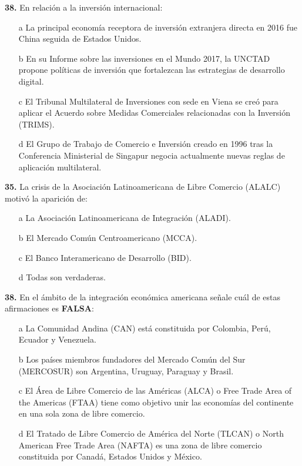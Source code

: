 \documentclass{nuevotema}
\begin{document}
\preguntas


\textbf{38.} En relación a la inversión internacional:

\begin{itemize}
	\item[a] La principal economía receptora de inversión extranjera directa en 2016 fue China seguida de Estados Unidos.
	\item[b] En su Informe sobre las inversiones en el Mundo 2017, la UNCTAD propone políticas de inversión que fortalezcan las estrategias de desarrollo digital.
	\item[c] El Tribunal Multilateral de Inversiones con sede en Viena se creó para aplicar el Acuerdo sobre Medidas Comerciales relacionadas con la Inversión (TRIMS).
	\item[d] El Grupo de Trabajo de Comercio e Inversión creado en 1996 tras la Conferencia Ministerial de Singapur negocia actualmente nuevas reglas de aplicación multilateral.
\end{itemize}

\textbf{35.} La crisis de la Asociación Latinoamericana de Libre Comercio (ALALC) motivó la aparición de:
\begin{itemize}
	\item[a] La Asociación Latinoamericana de Integración (ALADI).
	\item[b] El Mercado Común Centroamericano (MCCA).
	\item[c] El Banco Interamericano de Desarrollo (BID).
	\item[d] Todas son verdaderas.
\end{itemize}

\textbf{38.} En el ámbito de la integración económica americana señale cuál de estas afirmaciones es \textbf{FALSA}:
\begin{itemize}
	\item[a] La Comunidad Andina (CAN) está constituida por Colombia, Perú, Ecuador y Venezuela.
	\item[b] Los países miembros fundadores del Mercado Común del Sur (MERCOSUR) son Argentina, Uruguay, Paraguay y Brasil.
	\item[c] El Área de Libre Comercio de las Américas (ALCA) o Free Trade Area of the Americas (FTAA) tiene como objetivo unir las economías del continente en una sola zona de libre comercio.
	\item[d] El Tratado de Libre Comercio de América del Norte (TLCAN) o North American Free Trade Area (NAFTA) es una zona de libre comercio constituida por Canadá, Estados Unidos y México.
\end{itemize}
\end{document}
